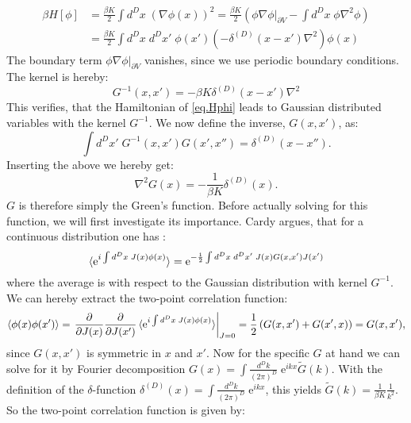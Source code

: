 \begin{align}
\beta H[\phi] &= \frac{\beta K}{2}\int d^{D}x \; \left(\nabla \phi(x)\right)^2 = \frac{\beta K}{2}\left( \left.\phi\nabla\phi\right|_{\partial V} - \int d^{D}x \; \phi \nabla^2\phi \right) \nonumber \\
&= \frac{\beta K}{2}\int d^{D}x\; d^{D}x'\; \phi(x')\left(-\delta^{(D)}(x - x')\nabla^2\right)\phi(x) \nonumber 
\end{align}
The boundary term $\left.\phi\nabla\phi\right|_{\partial V}$ vanishes, since we use periodic boundary conditions. The kernel is hereby: 
\begin{equation}
G^{-1}(x,x') = -\beta K \delta^{(D)}(x - x')\nabla^2 \nonumber
\end{equation}
This verifies, that the Hamiltonian of \eqref{eq.Hphi} leads to Gaussian distributed variables with the kernel $G^{-1}$. We now define the inverse, $G(x,x')$, as:
\begin{equation}
\int d^{D}x' \; G^{-1}(x,x')G(x',x'') = \delta^{(D)}(x - x''). \nonumber
\end{equation}
Inserting the above we hereby get:
\begin{equation}
\nabla^2G(x) = -\frac{1}{\beta K} \delta^{(D)}(x). \nonumber
\end{equation}
$G$ is therefore simply the Green's function. Before actually solving for this function, we will first investigate its importance. Cardy argues, that for a continuous distribution one has \cite[p. 227]{Cardy.StatPhys}: 
\begin{equation}
\braket{\text{e}^{i\int d^{D}x\; J(x) \phi(x)}} = \text{e}^{ -\frac{1}{2}\int d^{D}x\; d^{D}x'\; J(x) G(x,x') J(x')  }
\label{eq.gaussianintegration}
\end{equation}
where the average is with respect to the Gaussian distribution with kernel $G^{-1}$. We can hereby extract the two-point correlation function:
\begin{equation}
\braket{\phi(x)\phi(x')} = \left. \frac{\partial}{\partial J(x)}\frac{\partial}{\partial J(x')} \braket{\text{e}^{i\int d^{D}x\; J(x) \phi(x)}}\right|_{J = 0} = \frac{1}{2}\left(G(x, x') + G(x', x)\right) = G(x, x'), \nonumber
\end{equation} 
since $G(x,x')$ is symmetric in $x$ and $x'$. Now for the specific $G$ at hand we can solve for it by Fourier decomposition $G(x) = \int \frac{d^{D}k}{(2\pi)^D}\; \text{e}^{ikx} \tilde{G}(k)$. With the definition of the $\delta$-function $\delta^{(D)}(x) = \int \frac{d^{D}k}{(2\pi)^D}\; \text{e}^{ikx}$, this yields $\tilde{G}(k) = \frac{1}{\beta K}\frac{1}{k^2}$. So the two-point correlation function is given by: 
